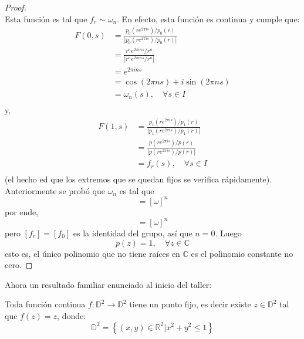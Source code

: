 \documentclass[12pt]{report}
\theoremstyle{largebreak}
\newcommand\abs[1]{\ensuremath{\left|#1\right|}}
\newcommand\cf[3]{\ensuremath{#1:#2\rightarrow#3}}
\begin{document}
\begin{proof}
\begin{equation*}
        \end{equation*}
        Esta función es tal que $f_r\sim\omega_n$. En efecto, esta función es continua y cumple que:
        \begin{equation*}
            \begin{split}
                F(0,s)&=\frac{p_0(re^{ 2\pi is})/p_0(r)}{\abs{p_0(re^{ 2\pi is})/p_0(r)}}\\
                &=\frac{r^n e^{ 2\pi ins}/r^n}{\abs{r^n e^{ 2\pi ins}/r^n}}\\
                &=e^{ 2\pi ins}\\
                &=\cos(2\pi ns) +i\sin(2\pi ns)\\
                &=\omega_n(s),\quad\forall s\in I\\ 
            \end{split}
        \end{equation*}
        y,
        \begin{equation*}
            \begin{split}
                F(1,s)&=\frac{p_1(re^{ 2\pi is})/p_1(r)}{\abs{p_1(re^{ 2\pi is})/p_1(r)}}\\
                &=\frac{p(re^{ 2\pi is})/p(r)}{\abs{p(re^{ 2\pi is})/p(r)}}\\
                &=f_r(s),\quad\forall s\in I\\
            \end{split}
        \end{equation*}
        (el hecho ed que los extremos que se quedan fijos se verifica rápidamente). Anteriormente se probó que $\omega_n$ es tal que
        \begin{equation*}
            [\omega_n]=[\omega]^n
        \end{equation*}
        por ende,
        \begin{equation*}
            [f_r]=[\omega]^n
        \end{equation*}
        pero $[f_r]=[f_0]$ es la identidad del grupo, así que $n=0$. Luego
        \begin{equation*}
            p(z)=1,\quad\forall z\in\mathbb{C}
        \end{equation*}
        esto es, el único polinomio que no tiene raíces en $\mathbb{C}$ es el polinomio constante no cero.
    \end{proof}

    Ahora un resultado familiar enunciado al inicio del taller:

    \begin{theor}
        Toda función continua $\cf{f}{\mathbb{D}^2}{\mathbb{D}^2}$ tiene un punto fijo, es decir existe $z\in\mathbb{D}^2$ tal que $f(z)=z$, donde:
        \begin{equation*}
            \mathbb{D}^2=\left\{(x,y)\in\mathbb{R}^2\Big|x^2+y^2\leq1 \right\}
        \end{equation*}
    \end{theor}
\end{document}
